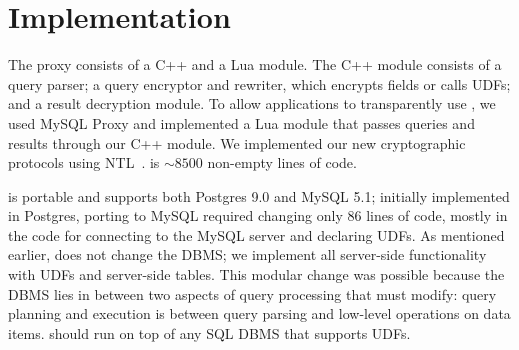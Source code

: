 
\section{Implementation}
\label{s:impl}

The \name{} proxy consists of a C++ and a Lua module.  The C++ module
consists of a query parser; a query encryptor and rewriter, which
encrypts fields or calls UDFs; and a result decryption module.  To
allow applications to transparently use \name, we used MySQL Proxy and
implemented a Lua module that passes queries and results through our
C++ module.  We implemented our new cryptographic protocols using
NTL~\cite{shoup:ntl}.  \name{} is $\sim 8500$ non-empty lines of code.

\name is portable and supports both Postgres 9.0 and MySQL 5.1;
initially implemented in Postgres, porting \name{} to MySQL required
changing only 86 lines of code, mostly in the code for connecting to the
MySQL server and declaring UDFs.  As mentioned earlier, \name{} does not
change the DBMS; we implement all server-side functionality with
UDFs and server-side tables.  This modular change was possible because
the DBMS lies in between two aspects of query processing that \name{}
must modify: query planning and execution is between query parsing
and low-level operations on data items.
\name should run on top of any SQL DBMS that supports UDFs.



